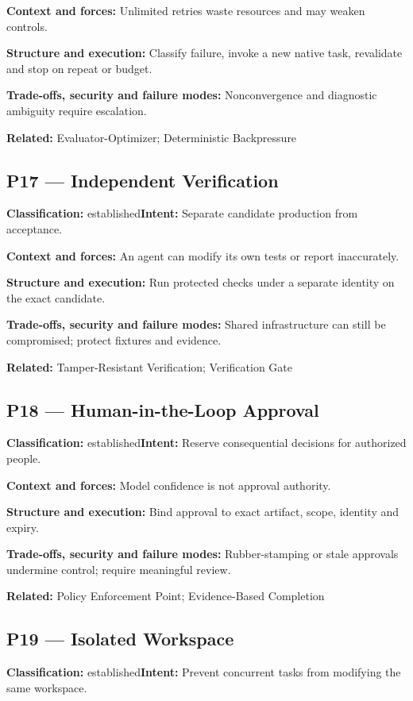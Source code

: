 \documentclass[11pt,letterpaper]{article}
\begin{document}
\textbf{Context and forces:} Unlimited retries waste resources and may weaken controls.

\textbf{Structure and execution:} Classify failure, invoke a new native task, revalidate and stop on repeat or budget.

\textbf{Trade-offs, security and failure modes:} Nonconvergence and diagnostic ambiguity require escalation.

\textbf{Related:} Evaluator-Optimizer; Deterministic Backpressure

\subsection*{P17 --- Independent Verification}
\textbf{Classification:} established\quad\textbf{Intent:} Separate candidate production from acceptance.

\textbf{Context and forces:} An agent can modify its own tests or report inaccurately.

\textbf{Structure and execution:} Run protected checks under a separate identity on the exact candidate.

\textbf{Trade-offs, security and failure modes:} Shared infrastructure can still be compromised; protect fixtures and evidence.

\textbf{Related:} Tamper-Resistant Verification; Verification Gate

\subsection*{P18 --- Human-in-the-Loop Approval}
\textbf{Classification:} established\quad\textbf{Intent:} Reserve consequential decisions for authorized people.

\textbf{Context and forces:} Model confidence is not approval authority.

\textbf{Structure and execution:} Bind approval to exact artifact, scope, identity and expiry.

\textbf{Trade-offs, security and failure modes:} Rubber-stamping or stale approvals undermine control; require meaningful review.

\textbf{Related:} Policy Enforcement Point; Evidence-Based Completion

\subsection*{P19 --- Isolated Workspace}
\textbf{Classification:} established\quad\textbf{Intent:} Prevent concurrent tasks from modifying the same workspace.
\end{document}
